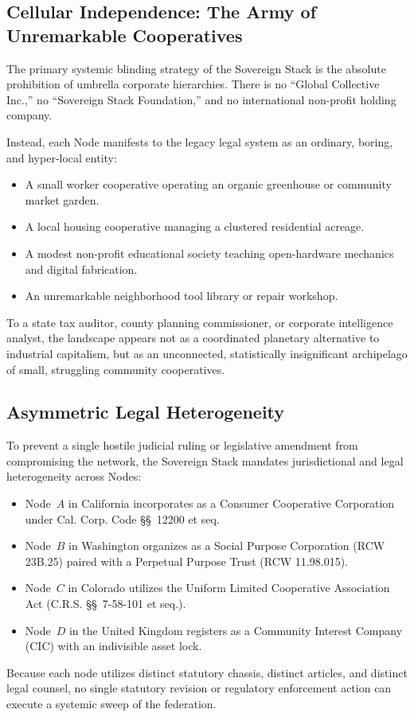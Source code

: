 \subsection{Cellular Independence: The Army of Unremarkable Cooperatives}

The primary systemic blinding strategy of the Sovereign Stack is the absolute prohibition of umbrella corporate hierarchies. There is no ``Global Collective Inc.,'' no ``Sovereign Stack Foundation,'' and no international non-profit holding company.

Instead, each Node manifests to the legacy legal system as an ordinary, boring, and hyper-local entity:
\begin{itemize}
  \item A small worker cooperative operating an organic greenhouse or community market garden.
  \item A local housing cooperative managing a clustered residential acreage.
  \item A modest non-profit educational society teaching open-hardware mechanics and digital fabrication.
  \item An unremarkable neighborhood tool library or repair workshop.
\end{itemize}
To a state tax auditor, county planning commissioner, or corporate intelligence analyst, the landscape appears not as a coordinated planetary alternative to industrial capitalism, but as an unconnected, statistically insignificant archipelago of small, struggling community cooperatives.

\subsection{Asymmetric Legal Heterogeneity}

To prevent a single hostile judicial ruling or legislative amendment from compromising the network, the Sovereign Stack mandates jurisdictional and legal heterogeneity across Nodes:
\begin{itemize}
  \item Node~$A$ in California incorporates as a Consumer Cooperative Corporation under Cal. Corp. Code \S\S~12200 et seq.
  \item Node~$B$ in Washington organizes as a Social Purpose Corporation (RCW 23B.25) paired with a Perpetual Purpose Trust (RCW 11.98.015).
  \item Node~$C$ in Colorado utilizes the Uniform Limited Cooperative Association Act (C.R.S. \S\S~7-58-101 et seq.).
  \item Node~$D$ in the United Kingdom registers as a Community Interest Company (CIC) with an indivisible asset lock.
\end{itemize}
Because each node utilizes distinct statutory chassis, distinct articles, and distinct legal counsel, no single statutory revision or regulatory enforcement action can execute a systemic sweep of the federation.

